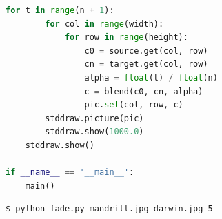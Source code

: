 \documentclass[8pt,a4paper,compress]{beamer}
\begin{document}
\begin{frame}[fragile]
\pause

\begin{lstlisting}[language=Python]
    for t in range(n + 1):
        for col in range(width):
            for row in range(height):
                c0 = source.get(col, row)
                cn = target.get(col, row)
                alpha = float(t) / float(n)
                c = blend(c0, cn, alpha)
                pic.set(col, row, c)
        stddraw.picture(pic)
        stddraw.show(1000.0)
    stddraw.show()

if __name__ == '__main__':
    main()
\end{lstlisting}

\pause

\begin{lstlisting}[language={}]
$ python fade.py mandrill.jpg darwin.jpg 5
\end{lstlisting}
\begin{minipage}{300pt}
\end{minipage}
\end{frame}
\end{document}
